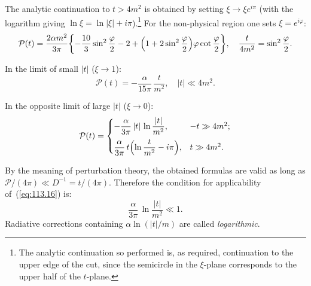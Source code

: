 The analytic continuation to $t > 4m^2$ is obtained by setting $\xi \to \xi e^{i\pi}$ (with the logarithm giving $\ln\xi = \ln|\xi| + i\pi$).\footnote{The analytic continuation so performed is, as required, continuation to the upper edge of the cut, since the semicircle in the $\xi$-plane corresponds to the upper half of the $t$-plane.} For the non-physical region one sets $\xi = e^{i\varphi}$:
\begin{equation}
\mathcal{P}(t) = \frac{2\alpha m^2}{3\pi}\biggl\{-\frac{10}{3}\sin^2\frac{\varphi}{2} - 2 + \Bigl(1 + 2\sin^2\frac{\varphi}{2}\Bigr)\varphi\cot\frac{\varphi}{2}\biggr\}, \quad \frac{t}{4m^2} = \sin^2\frac{\varphi}{2}.
\label{eq:113.14}
\end{equation}

In the limit of small $|t|$ ($\xi \to 1$):
\begin{equation}
\mathcal{P}(t) = -\frac{\alpha}{15\pi}\,\frac{t}{m^2}, \quad |t| \ll 4m^2.
\label{eq:113.15}
\end{equation}


In the opposite limit of large $|t|$ ($\xi \to 0$):
\begin{equation}
\mathcal{P}(t) = \begin{cases}
\displaystyle -\frac{\alpha}{3\pi}\,|t|\,\ln\frac{|t|}{m^2}, & -t \gg 4m^2; \\[8pt]
\displaystyle \frac{\alpha}{3\pi}\,t\Bigl(\ln\frac{t}{m^2} - i\pi\Bigr), & t \gg 4m^2.
\end{cases}
\label{eq:113.16}
\end{equation}

By the meaning of perturbation theory, the obtained formulas are valid as long as $\mathcal{P}/(4\pi) \ll D^{-1} = t/(4\pi)$. Therefore the condition for applicability of~(\ref{eq:113.16}) is:
\begin{equation}
\frac{\alpha}{3\pi}\,\ln\frac{|t|}{m^2} \ll 1.
\label{eq:113.17}
\end{equation}
Radiative corrections containing $\alpha\ln(|t|/m)$ are called \emph{logarithmic}.
